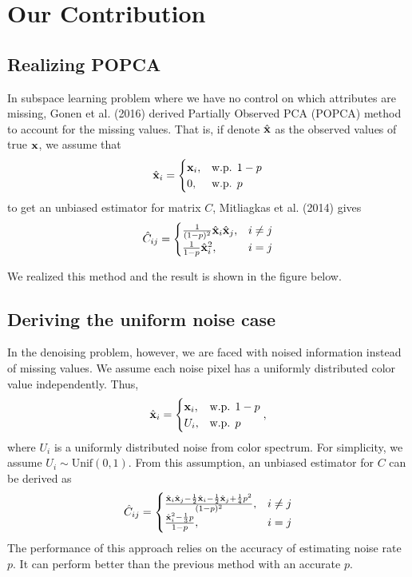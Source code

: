 \documentclass[12pt]{article}
\newcommand{\V}[1]{{\mathbf{\MakeLowercase{#1}}}}
\newcommand{\Vhat}[1]{\hat{\mathbf{\MakeLowercase{#1}}}}
\begin{document}
	\section{Our Contribution}
	\subsection{Realizing POPCA}
	In subspace learning problem where we have no control on which attributes are missing, Gonen et al. (2016) derived Partially Observed PCA (POPCA) method to account for the missing values. That is,
	if denote $\Vhat{x}$ as the observed values of true $\V{x}$, we assume that
	\[
	\Vhat{x}_i = 
	\begin{cases}
	\V{x}_i, & \textrm{w.p. } 1-p \\
	0, & \textrm{w.p. } p
	\end{cases}
	\]
	to get an unbiased estimator for matrix $C$, Mitliagkas et al. (2014) gives
	\[
	\hat{C}_{ij} = 
	\begin{cases}
	\frac{1}{(1-p)^2} \Vhat{x}_i \Vhat{x}_j , & i \neq j \\
	\frac{1}{1-p} \Vhat{x}_i^2, & i = j
	\end{cases}
	\]
	
	We realized this method and the result is shown in the figure below.
	
	\subsection{Deriving the uniform noise case}
	
	In the denoising problem, however, we are faced with noised information instead of missing values. We assume each noise pixel has a uniformly distributed color value independently. Thus, 
	\[
	\Vhat{x}_i =
	\begin{cases}
	\V{x}_i, & \textrm{w.p. } 1-p \\
	U_i, & \textrm{w.p. } p
	\end{cases},
	\]
	where $U_i$ is a uniformly distributed noise from color spectrum. For simplicity, we assume $U_i \sim \textrm{Unif}(0,1)$. From this assumption, an unbiased estimator for $C$ can be derived as
	\[
	\hat{C}_{ij} =
	\begin{cases}
	\frac{ \Vhat{x}_i \Vhat{x}_j - \frac{1}{2} \Vhat{x}_i - \frac{1}{2} \Vhat{x}_j + \frac{1}{4}p^2 }{(1-p)^2}, & i \neq j \\
	\frac{\Vhat{x}_i^2 - \frac{1}{3}p }{1-p}, & i = j
	\end{cases}
	\]
	The performance of this approach relies on the accuracy of estimating noise rate $p$. It can perform better than the previous method with an accurate $p$. 
	
\end{document}

